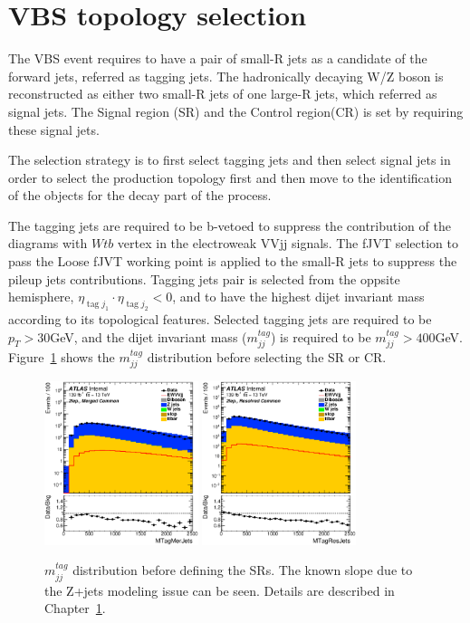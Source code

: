\section{VBS topology selection}
The VBS event requires to have a pair of small-R jets as a candidate of the forward jets, referred as tagging jets.
The hadronically decaying W/Z boson is reconstructed as either two small-R jets of one large-R jets, which referred as signal jets. The Signal region (SR) and the Control region(CR) is set by requiring these signal jets.

The selection strategy is to first select tagging jets and then select signal jets in order to select the production topology first and then move to the identification of the objects for the decay part of the process.

The tagging jets are required to be b-vetoed to suppress the contribution of the diagrams with $Wtb$ vertex in the electroweak VVjj signals. The fJVT selection to pass the Loose fJVT working point is applied to the small-R jets to suppress the pileup jets contributions.
Tagging jets pair is selected from the oppsite hemisphere, $\eta_{\operatorname{tag} j_{1}} \cdot \eta_{\operatorname{tag} j_{2}}<0$, and to have the highest dijet invariant mass according to its topological features.
Selected tagging jets are required to be $p_T > 30$GeV, and the dijet invariant mass ($m^{tag}_{jj}$) is required to be $m^{tag}_{jj} > 400$GeV.
Figure~\ref{fig:Mtagjj} shows the $m^{tag}_{jj}$ distribution before selecting the SR or CR. 
\begin{figure}[ht]
    \centering
    \includegraphics[width=0.4\textwidth]{figures/2lep/dataMC/C_0ptag1pfat0pjet_0ptv_MergedCommon_MTagMerJets_Log}
    \includegraphics[width=0.4\textwidth]{figures/2lep/dataMC/C_0ptag2pjet_0ptv_ResolvedCommon_MTagResJets_Log} 
    \caption{$m^{tag}_{jj}$ distribution before defining the SRs. The known slope due to the Z+jets modeling issue can be seen. Details are described in Chapter~\ref{}.}
    \label{fig:Mtagjj}
\end{figure}

